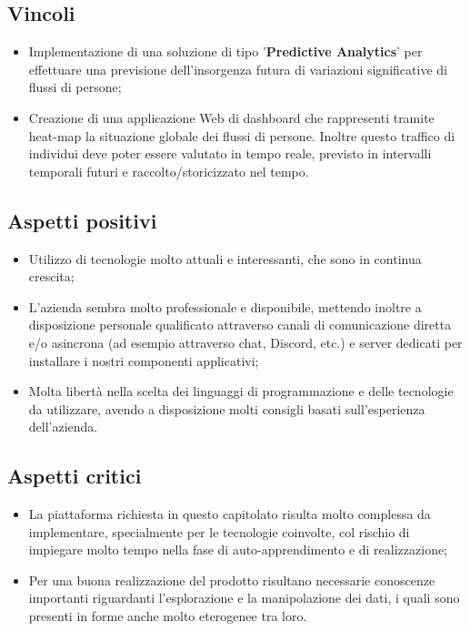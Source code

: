 \subsection{Vincoli}{
\begin{itemize}
\item Implementazione di una soluzione di tipo '\textbf{Predictive Analytics}' per effettuare una previsione dell'insorgenza futura di variazioni significative di flussi di persone;
\item Creazione di una applicazione Web di dashboard che rappresenti tramite heat-map la situazione globale dei flussi di persone. Inoltre questo traffico di individui deve poter essere valutato in tempo reale, previsto in intervalli temporali futuri e raccolto/storicizzato nel tempo.
\end{itemize}
}

\subsection{Aspetti positivi}{
\begin{itemize}
\item Utilizzo di tecnologie molto attuali e interessanti, che sono in continua crescita;
\item L'azienda sembra molto professionale e disponibile, mettendo inoltre a disposizione personale qualificato attraverso canali di comunicazione diretta e/o asincrona (ad esempio attraverso chat, Discord, etc.) e server dedicati per installare i nostri componenti applicativi;
\item Molta libertà nella scelta dei linguaggi di programmazione e delle tecnologie da utilizzare, avendo a disposizione molti consigli basati sull'esperienza dell'azienda.
\end{itemize}
}

\subsection{Aspetti critici}{
\begin{itemize}
\item La piattaforma richiesta in questo capitolato risulta molto complessa da implementare, specialmente per le tecnologie coinvolte, col rischio di impiegare molto tempo nella fase di auto-apprendimento e di realizzazione;
\item Per una buona realizzazione del prodotto risultano necessarie conoscenze importanti riguardanti l'esplorazione e la manipolazione dei dati, i quali sono presenti in forme anche molto eterogenee tra loro.
\end{itemize}
}

